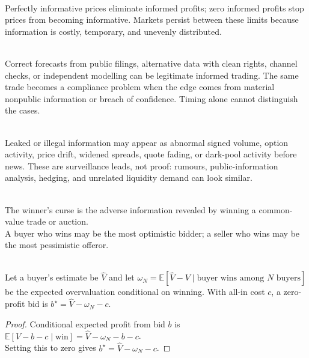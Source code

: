 \begin{caveat} \\
Perfectly informative prices eliminate informed profits; zero informed profits stop prices from becoming informative. Markets persist between these limits because information is costly, temporary, and unevenly distributed.
\end{caveat}

\begin{caveat} \\
Correct forecasts from public filings, alternative data with clean rights, channel checks, or independent modelling can be legitimate informed trading. The same trade becomes a compliance problem when the edge comes from material nonpublic information or breach of confidence. Timing alone cannot distinguish the cases.
\end{caveat}

\begin{mechanism} \\
Leaked or illegal information may appear as abnormal signed volume, option activity, price drift, widened spreads, quote fading, or dark-pool activity before news. These are surveillance leads, not proof: rumours, public-information analysis, hedging, and unrelated liquidity demand can look similar.
\end{mechanism}

\begin{definition} \\
The winner's curse is the adverse information revealed by winning a common-value trade or auction.\\
A buyer who wins may be the most optimistic bidder; a seller who wins may be the most pessimistic offeror.
\end{definition}

\begin{proposition} \\
Let a buyer's estimate be $\widehat{V}$ and let $\omega_N=\mathbb{E}[\widehat{V}-V\mid\text{buyer wins among }N\text{ buyers}]$ be the expected overvaluation conditional on winning. With all-in cost $c$, a zero-profit bid is $b^\star=\widehat{V}-\omega_N-c$.
\begin{proof}
Conditional expected profit from bid $b$ is $\mathbb{E}[V-b-c\mid\text{win}]=\widehat{V}-\omega_N-b-c$.\\
Setting this to zero gives $b^\star=\widehat{V}-\omega_N-c$.
\end{proof}
\end{proposition}

